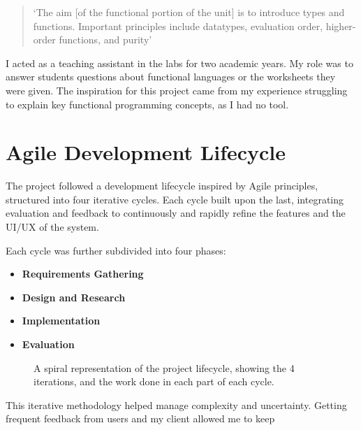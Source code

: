 \begin{quote}
`The aim [of the functional portion of the unit] is to introduce types and functions. Important principles include datatypes, evaluation order, higher-order functions, and purity' \cite{COMS10016}
\end{quote}

\noindent I acted as a teaching assistant in the labs for two academic years. My role was to answer students questions about functional languages or the worksheets they were given. The inspiration for this project came from my experience struggling to explain key functional programming concepts, as I had no tool.

\section{Agile Development Lifecycle}
The project followed a development lifecycle inspired by Agile principles\cite{agilemanifesto2001}, structured into four iterative cycles. Each cycle built upon the last, integrating evaluation and feedback to continuously and rapidly refine the features and the UI/UX of the system. 

Each cycle was further subdivided into four phases:

\begin{itemize}
    \item \textbf{Requirements Gathering}
    \item \textbf{Design and Research}
    \item \textbf{Implementation}
    \item \textbf{Evaluation}
\end{itemize}

\begin{figure}[t]
    \centering
    \caption{A spiral representation of the project lifecycle, showing the 4 iterations, and the work done in each part of each cycle. }\label{fig:spiral}
\end{figure}

This iterative methodology helped manage complexity and uncertainty. Getting frequent feedback from users and my client allowed me to keep 


